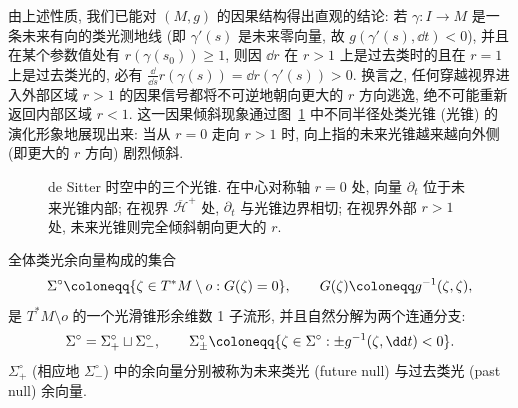由上述性质, 我们已能对 $(M, g)$ 的因果结构得出直观的结论: 若 $\gamma \colon I \to M$ 是一条未来有向的类光测地线 (即 $\gamma'(s)$ 是未来零向量, 故 $g(\gamma'(s), \dd t) < 0$), 并且在某个参数值处有 $r(\gamma(s_0)) \ge 1$, 则因 $\dd r$ 在 $r > 1$ 上是过去类时的且在 $r = 1$ 上是过去类光的, 必有 $\frac{\dd}{\dd s} r(\gamma(s)) = \dd r(\gamma'(s)) > 0$. 换言之, 任何穿越视界进入外部区域 $r > 1$ 的因果信号都将不可逆地朝向更大的 $r$ 方向逃逸, 绝不可能重新返回内部区域 $r < 1$. 这一因果倾斜现象通过图~\ref{fig:11.1} 中不同半径处类光锥 (光锥) 的演化形象地展现出来: 当从 $r = 0$ 走向 $r > 1$ 时, 向上指的未来光锥越来越向外侧 (即更大的 $r$ 方向) 剧烈倾斜.

\begin{figure}[htbp]
\centering
\drawFigElevenOne
\caption{de Sitter 时空中的三个光锥. 在中心对称轴 $r = 0$ 处, 向量 $\partial_t$ 位于未来光锥内部; 在视界 $\overline{\mathcal{H}}^+$ 处, $\partial_t$ 与光锥边界相切; 在视界外部 $r > 1$ 处, 未来光锥则完全倾斜朝向更大的 $r$.}\label{fig:11.1}
\end{figure}

全体类光余向量构成的集合
\begin{equation}\label{eq:11.6}
    \Sigma^\circ \defeq \{\zeta \in T^* M \setminus o : G(\zeta) = 0\}, \qquad G(\zeta) \defeq g^{-1}(\zeta, \zeta),
\end{equation}
是 $T^* M \setminus o$ 的一个光滑锥形余维数 1 子流形, 并且自然分解为两个连通分支:
\begin{equation}\label{eq:11.7}
    \Sigma^\circ = \Sigma_+^\circ \sqcup \Sigma_-^\circ, \qquad \Sigma_\pm^\circ \defeq \{\zeta \in \Sigma^\circ : \pm g^{-1}(\zeta, \dd t) < 0\}.
\end{equation}
$\Sigma_+^\circ$ (相应地 $\Sigma_-^\circ$) 中的余向量分别被称为未来类光 (future null) 与过去类光 (past null) 余向量.


